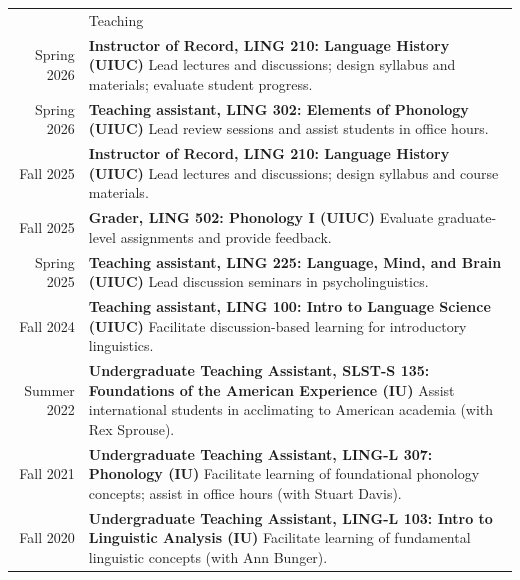 \documentclass[letterpaper, 11pt]{article}
\newcommand{\headingfont}{\Large\color{accentcolor}}
\newenvironment{SectionTable}[1]{
	\setlength{\LTpre}{0pt}
	\setlength{\LTpost}{0pt}
	\renewcommand*{\arraystretch}{1.4}
	\setlength{\tabcolsep}{10pt}
	\begin{longtable}{Rp{5.9in}} & #1 \\}
{\end{longtable}\vspace{0.25cm}}
\begin{document}
\begin{SectionTable}{\headingfont Teaching}
	Spring 2026 &
	\textbf{Instructor of Record, LING 210: Language History (UIUC)} \newline
	Lead lectures and discussions; design syllabus and materials; evaluate student progress. \\

	Spring 2026 &
	\textbf{Teaching assistant, LING 302: Elements of Phonology (UIUC)} \newline
	Lead review sessions and assist students in office hours. \\

	Fall 2025 &
	\textbf{Instructor of Record, LING 210: Language History (UIUC)} \newline
	Lead lectures and discussions; design syllabus and course materials. \\

	Fall 2025 &
	\textbf{Grader, LING 502: Phonology I (UIUC)} \newline
	Evaluate graduate-level assignments and provide feedback. \\

	Spring 2025 &
	\textbf{Teaching assistant, LING 225: Language, Mind, and Brain (UIUC)} \newline
	Lead discussion seminars in psycholinguistics. \\

	Fall 2024 &
	\textbf{Teaching assistant, LING 100: Intro to Language Science (UIUC)} \newline
	Facilitate discussion-based learning for introductory linguistics. \\

	Summer 2022 &
	\textbf{Undergraduate Teaching Assistant, SLST-S 135: Foundations of the American Experience (IU)} \newline
	Assist international students in acclimating to American academia (with Rex Sprouse). \\

	Fall 2021 &
	\textbf{Undergraduate Teaching Assistant, LING-L 307: Phonology (IU)} \newline
	Facilitate learning of foundational phonology concepts; assist in office hours (with Stuart Davis). \\

	Fall 2020 &
	\textbf{Undergraduate Teaching Assistant, LING-L 103: Intro to Linguistic Analysis (IU)} \newline
	Facilitate learning of fundamental linguistic concepts (with Ann Bunger).
\end{SectionTable}
\end{document}
